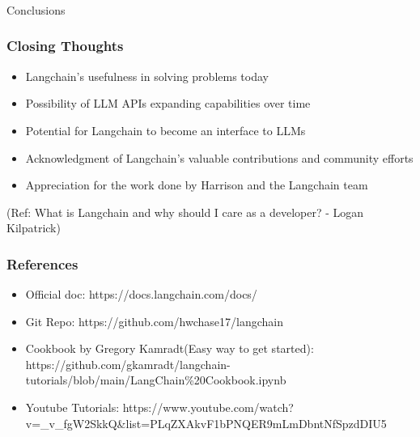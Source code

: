 \begin{frame}[fragile]\frametitle{}
\begin{center}
{\Large Conclusions}
\end{center}
\end{frame}

\begin{frame}[fragile]\frametitle{Closing Thoughts}

\begin{itemize}
\item Langchain's usefulness in solving problems today
\item Possibility of LLM APIs expanding capabilities over time
\item Potential for Langchain to become an interface to LLMs
\item Acknowledgment of Langchain's valuable contributions and community efforts
\item Appreciation for the work done by Harrison and the Langchain team
\end{itemize}

{\tiny (Ref: What is Langchain and why should I care as a developer? - Logan Kilpatrick)}

\end{frame}

\begin{frame}[fragile]\frametitle{References}


\begin{itemize}
\item Official doc: https://docs.langchain.com/docs/
\item Git Repo: https://github.com/hwchase17/langchain
\item Cookbook by Gregory Kamradt(Easy way to get started): https://github.com/gkamradt/langchain-tutorials/blob/main/LangChain\%20Cookbook.ipynb
\item Youtube Tutorials: https://www.youtube.com/watch?v=\_v\_fgW2SkkQ\&list=PLqZXAkvF1bPNQER9mLmDbntNfSpzdDIU5
\end{itemize}


\end{frame}